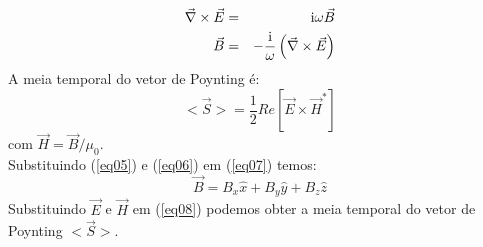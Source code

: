 \begin{eqnarray}
 \vec{\nabla}\times\vec{E} & = &{\rm i}\omega \vec{B}\nonumber\\
     \vec{B} & = &  -\frac{ {\rm i}}{\omega} \left(\vec{\nabla}\times\vec{E}\right)  \label{eq07}
\end{eqnarray}
A meia temporal do vetor de Poynting \'e:
\begin{equation}\label{eq08}
     <\vec{S}>  =   \frac{1}{2}Re\left[ \vec{E}\times\vec{H}^{*} \right]
\end{equation}
com $\vec{H}=\vec{B}/\mu_{0}$.\\
Substituindo (\ref{eq05}) e (\ref{eq06}) em (\ref{eq07}) temos:
\begin{equation}\label{eq09}
     \vec{B}  =  B_x\hat{x} +B_y\hat{y}+B_z\hat{z}
\end{equation}
Substituindo $\vec{E}$ e $\vec{H}$ em (\ref{eq08}) podemos obter a meia temporal do vetor de Poynting $<\vec{S}>$.\\
